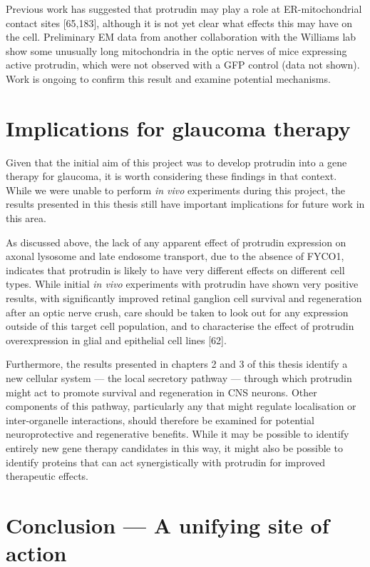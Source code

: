 \documentclass[
  12pt,
  a4paper,
]{book}
\begin{document}
Previous work has suggested that protrudin may play a role at ER-mitochondrial contact sites {[}65,183{]}, although it is not yet clear what effects this may have on the cell. Preliminary EM data from another collaboration with the Williams lab show some unusually long mitochondria in the optic nerves of mice expressing active protrudin, which were not observed with a GFP control (data not shown). Work is ongoing to confirm this result and examine potential mechanisms.

\hypertarget{implications-for-glaucoma-therapy}{%
\section{Implications for glaucoma therapy}\label{implications-for-glaucoma-therapy}}

Given that the initial aim of this project was to develop protrudin into a gene therapy for glaucoma, it is worth considering these findings in that context. While we were unable to perform \emph{in vivo} experiments during this project, the results presented in this thesis still have important implications for future work in this area.

As discussed above, the lack of any apparent effect of protrudin expression on axonal lysosome and late endosome transport, due to the absence of FYCO1, indicates that protrudin is likely to have very different effects on different cell types. While initial \emph{in vivo} experiments with protrudin have shown very positive results, with significantly improved retinal ganglion cell survival and regeneration after an optic nerve crush, care should be taken to look out for any expression outside of this target cell population, and to characterise the effect of protrudin overexpression in glial and epithelial cell lines {[}62{]}.

Furthermore, the results presented in chapters 2 and 3 of this thesis identify a new cellular system --- the local secretory pathway --- through which protrudin might act to promote survival and regeneration in CNS neurons. Other components of this pathway, particularly any that might regulate localisation or inter-organelle interactions, should therefore be examined for potential neuroprotective and regenerative benefits. While it may be possible to identify entirely new gene therapy candidates in this way, it might also be possible to identify proteins that can act synergistically with protrudin for improved therapeutic effects.

\hypertarget{conclusion-a-unifying-site-of-action}{%
\section{Conclusion --- A unifying site of action}\label{conclusion-a-unifying-site-of-action}}
\end{document}
